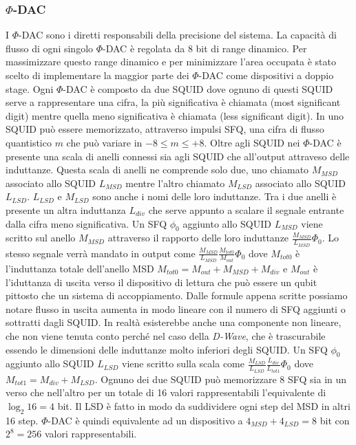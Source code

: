 \subsubsection{$\Phi$-DAC}
I $\Phi$-DAC sono i diretti responsabili della precisione del sistema. La capacità di flusso di ogni singolo $\Phi$-DAC è regolata da 8 bit di range dinamico. Per massimizzare questo range dinamico e per minimizzare l'area occupata è stato scelto di implementare la maggior parte dei $\Phi$-DAC come dispositivi a doppio stage. Ogni $\Phi$-DAC è composto da due SQUID dove ognuno di questi SQUID serve a rappresentare una cifra, la più significativa è chiamata  (most significant digit) mentre quella meno significativa è chiamata  (less significant digit). In uno SQUID può essere memorizzato, attraverso impulsi SFQ, una cifra di flusso quantistico $m$ che può variare in $-8 \le m \le +8$. Oltre agli SQUID nei $\Phi$-DAC è presente una scala di anelli connessi sia agli SQUID che all'output attraveso delle induttanze. Questa scala di anelli ne comprende solo due, uno chiamato $M_{MSD}$ associato allo SQUID $L_{MSD}$ mentre l'altro chiamato $M_{LSD}$ associato allo SQUID $L_{LSD}$. $L_{LSD}$ e $M_{LSD}$ sono anche i nomi delle loro induttanze.
Tra i due anelli è presente un altra induttanza $L_{div}$ che serve appunto a scalare il segnale entrante dalla cifra meno significativa. Un SFQ $\phi_0$ aggiunto allo SQUID $L_{MSD}$ viene scritto sul anello $M_{MSD}$ attraverso il rapporto delle loro induttanze $\frac{M_{MSD}}{L_{MSD}}\Phi_0$.
Lo stesso segnale verrà mandato in output come $\frac{M_{MSD}}{L_{MSD}}\frac{M_{tot0}}{M_{out}}\Phi_0$ dove $M_{tot0}$ è l'induttanza totale dell'anello MSD $M_{tot0} = M_{out} + M_{MSD} + M_{div}$ e $M_{out}$ è l'iduttanza di uscita verso il dispositivo di lettura che può essere un qubit pittosto che un sistema di accoppiamento. Dalle formule appena scritte possiamo notare flusso in uscita aumenta in modo lineare con il numero di SFQ aggiunti o sottratti dagli SQUID. In realtà esisterebbe anche una componente non lineare, che non viene tenuta conto perché nel caso della \textit{D-Wave}, che è trascurabile essendo le dimensioni delle induttanze molto inferiori degli SQUID.
Un SFQ $\phi_0$ aggiunto allo SQUID $L_{LSD}$ viene scritto sulla scala come $\frac{M_{LSD}}{L_{LSD}}\frac{L_{div}}{L_{tot1}}\Phi_0$ dove $M_{tot1} = M_{div} + M_{LSD}$. Ognuno dei due SQUID può memorizzare 8 SFQ sia in un verso che nell'altro per un totale di 16 valori rappresentabili l'equivalente di $\log_2{16} = 4$ bit. Il LSD è fatto in modo da suddividere ogni step del MSD in altri 16 step. $\Phi$-DAC è quindi equivalente ad un dispositivo a $4_{MSD} + 4_{LSD} = 8$ bit con $2^8 = 256$ valori rappresentabili.
